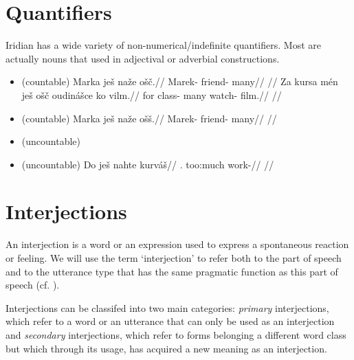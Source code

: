\section{Quantifiers}
Iridian has a wide variety of non-numerical/indefinite quantifiers.  Most are actually nouns that used in adjectival or adverbial constructions.


\begin{itemize}
    \item {}  (countable)
    \ex
    \begingl
    \gla Marka ješ naže ošč.//
    \glb Marek-\Acc{} \Exst{} friend-\Gen{} many//
    \glft {}//
    \endgl
    \xe
    \ex
    \begingl
    \gla Za kursa mén ješ ošč oudinášce ko vilm.//
    \glb for class-\Acc{}  \Exst{} many watch-\Sup{} \Att{} film.//
    \glft {}//
    \endgl
    \xe
    \item {}  (countable)
    \ex
    \begingl
    \gla Marka ješ naže ošš.//
    \glb Marek-\Acc{} \Exst{} friend-\Gen{} many//
    \glft {}//
    \endgl
    \xe
    \item {}  (uncountable)
    \item {}  (uncountable)
    \ex
    \begingl
    \gla Do ješ nahte kurváš//
    \glb \First{}\Sg{}.\Acc{} \Exst{} too:much work-\SupN{}//
    \glft {}//
    \endgl
    \xe

\end{itemize}

\section{Interjections}

An interjection is a word or an expression used to express a spontaneous reaction or feeling. We will use the term `interjection' to refer both to the part of speech and to the utterance type that has the same pragmatic function as this part of speech (cf. \cite{ameka1992}).

Interjections can be classifed into two main categories: \emph{primary} interjections, which refer to a word or an utterance that can only be used as an interjection and \emph{secondary} interjections, which refer to forms belonging a different word class but which through its usage, has acquired a new meaning as an interjection.

